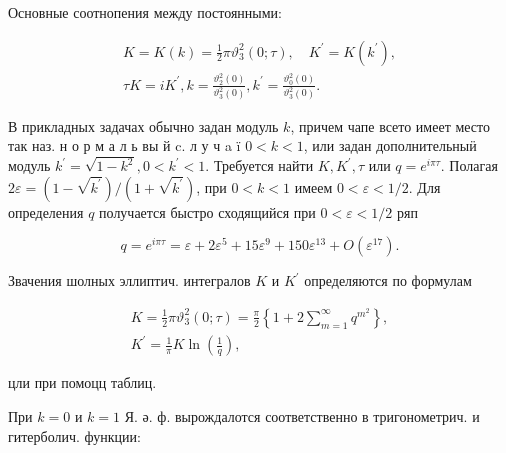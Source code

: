 \documentclass[10pt]{article}
\begin{document}
Основные соотнопения между постоянными:



\[

\begin{gathered}

K=K(k)=\frac{1}{2} \pi \vartheta_{3}^{2}(0 ; \tau), \quad K^{\prime}=K\left(k^{\prime}\right), \\

\tau K=i K^{\prime}, k=\frac{\vartheta_{2}^{2}(0)}{\vartheta_{3}^{2}(0)}, k^{\prime}=\frac{\vartheta_{0}^{2}(0)}{\vartheta_{3}^{2}(0)} .

\end{gathered}

\]



В прикладных задачах обычно задан модуль $k$, причем чапе всето имеет место так наз. н о р м а л ь вы й c. л у ч a ï $0<k<1$, или задан дополнительныӥ модуль $k^{\prime}=\sqrt{1-k^{2}}, 0<k^{\prime}<1$. Требуется найти $K, K^{\prime}, \tau$ или $q=e^{i \pi \tau}$. Полагая $2 \varepsilon=\left(1-\sqrt{k^{\prime}}\right) /\left(1+\sqrt{k^{\prime}}\right)$, при $0<k<1$ имеем $0<\varepsilon<1 / 2$. Для определения $q$ получается быстро сходящийся при $0<\varepsilon<1 / 2$ ряп



\[

q=e^{i \pi \tau}=\varepsilon+2 \varepsilon^{5}+15 \varepsilon^{9}+150 \varepsilon^{13}+O\left(\varepsilon^{17}\right) .

\]



Звачения шолных эллиптич. интегралов $K$ и $K^{\prime}$ определяются по формулам



\[

\begin{gathered}

K=\frac{1}{2} \pi \vartheta_{3}^{2}(0 ; \tau)=\frac{\pi}{2}\left\{1+2 \sum_{m=1}^{\infty} q^{m^{2}}\right\}, \\

K^{\prime}=\frac{1}{\pi} K \ln \left(\frac{1}{q}\right),

\end{gathered}

\]



цли при помоцц таблиц.



При $k=0$ и $k=1$ Я. ә. ф. вырождалотся соответственно в тригонометрич. и гитерболич. функции:
\end{document}
